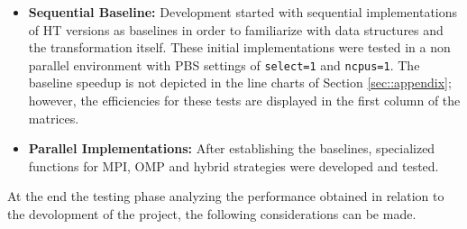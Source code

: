 \documentclass[conference]{IEEEtran}
\begin{document}
        \begin{itemize}
            \item \textbf{Sequential Baseline:} Development started with sequential implementations of HT versions as baselines in order to familiarize with data structures and the transformation itself. These initial implementations were tested in a non parallel environment with PBS settings of \texttt{select=1} and \texttt{ncpus=1}. The baseline speedup is not depicted in the line charts of Section \ref{sec::appendix}; however, the efficiencies for these tests are displayed in the first column of the matrices.
            
            \item \textbf{Parallel Implementations:} After establishing the baselines, specialized functions for MPI, OMP and hybrid strategies were developed and tested.
        \end{itemize}

    
        At the end the testing phase analyzing the performance obtained in relation to the devolopment of the project, the following considerations can be made.
        
\end{document}
